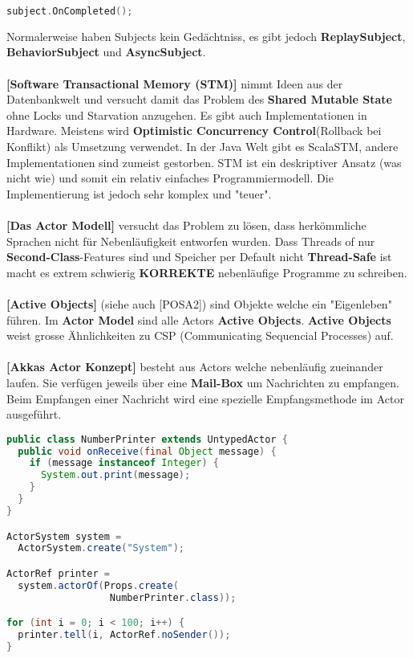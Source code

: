 \documentclass[8pt]{extarticle}
\let\oldtextbf\textbf
\renewcommand{\textbf}{\tiny\oldtextbf}
\begin{document}
\begin{multicols*}{5}
\begin{lstlisting}[language=c++]
subject.OnCompleted();
\end{lstlisting}
Normalerweise haben Subjects kein Gedächtniss, es gibt jedoch \textbf{ReplaySubject}, \textbf{BehaviorSubject} und \textbf{AsyncSubject}.\\\\
\textbf{[Software Transactional Memory (STM)]} nimmt Ideen aus der Datenbankwelt und versucht damit das Problem des \textbf{Shared Mutable State} ohne Locks und Starvation anzugehen. Es gibt auch Implementationen in Hardware. Meistens wird \textbf{Optimistic Concurrency Control}(Rollback bei Konflikt) als Umsetzung verwendet. In der Java Welt gibt es ScalaSTM, andere Implementationen sind zumeist gestorben. STM ist ein deskriptiver Ansatz (was nicht wie) und somit ein relativ einfaches Programmiermodell. Die Implementierung ist jedoch sehr komplex und "teuer".\\\\
\textbf{[Das Actor Modell]} versucht das Problem zu lösen, dass herkömmliche Sprachen nicht für Nebenläufigkeit entworfen wurden. Dass Threads of nur \textbf{Second-Class}-Features sind und Speicher per Default nicht \textbf{Thread-Safe} ist macht es extrem schwierig \textbf{KORREKTE} nebenläufige Programme zu schreiben.\\\\
\textbf{[Active Objects]} (siehe auch [POSA2]) sind Objekte welche ein "Eigenleben" führen. Im \textbf{Actor Model} sind alle Actors \textbf{Active Objects}. \textbf{Active Objects} weist grosse Ähnlichkeiten zu CSP (Communicating Sequencial Processes) auf.\\\\
\textbf{[Akkas Actor Konzept]} besteht aus Actors welche nebenläufig zueinander laufen. Sie verfügen jeweils über eine \textbf{Mail-Box} um Nachrichten zu empfangen. Beim Empfangen einer Nachricht wird eine spezielle Empfangsmethode im Actor ausgeführt.
\begin{lstlisting}[language=java]
public class NumberPrinter extends UntypedActor {
  public void onReceive(final Object message) {
    if (message instanceof Integer) {
      System.out.print(message);
    }
  }
}

ActorSystem system =
  ActorSystem.create("System");

ActorRef printer =
  system.actorOf(Props.create(
                  NumberPrinter.class));

for (int i = 0; i < 100; i++) {
  printer.tell(i, ActorRef.noSender());
}


\end{lstlisting}
\end{multicols*}
\end{document}
